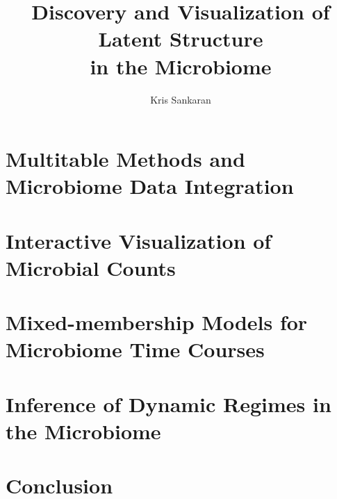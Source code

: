 \documentclass{report}
\title{Discovery and Visualization of Latent Structure \\ in the Microbiome}
\author{Kris Sankaran}
\begin{document}
\maketitle
\tableofcontents

\chapter{Multitable Methods and Microbiome Data Integration}

\chapter{Interactive Visualization of Microbial Counts}


\chapter{Mixed-membership Models for Microbiome Time Courses}
\chapter{Inference of Dynamic Regimes in the Microbiome}
\chapter{Conclusion}



\end{document}
